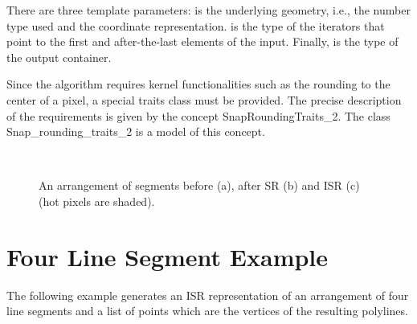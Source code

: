 There are three template parameters:  is the underlying geometry, i.e., the number type used
and the coordinate representation.  is the type of the iterators that point to the first
and after-the-last elements of the input. Finally,  is the type of the output container.

Since the algorithm requires kernel functionalities such as the rounding to the center of a pixel, a special
traits class must be provided. The precise description of the requirements is given by the
concept SnapRoundingTraits\_2. The class Snap\_rounding\_traits\_2 is a model of this concept.

\begin{figure}
\begin{center}
\  \
\end{center}
\vspace{-2ex}
\caption{An arrangement of segments before (a), after SR (b)
and ISR (c) (hot pixels are shaded).}
\label{fig:isr_vs_sr}
\end{figure}

\section{Four Line Segment Example}

The following example generates an ISR representation
of an arrangement of four line segments
and a list of points which are the vertices of the resulting polylines.








